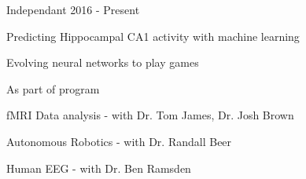 \begin{cventries}
\cvrpentry
    {Independant} %
    {} %
    {} %
    {2016 - Present} %
    {
      \begin{cvitems} %
        \item {Predicting Hippocampal CA1 activity with machine learning}
	\item {Evolving neural networks to play games}
      \end{cvitems}
    }

\cvrpentry
    {As part of program} %
    {} %
    {} %
    {} %
    {
      \begin{cvitems} %
        \item {fMRI Data analysis - with Dr. Tom James, Dr. Josh Brown}
	\item {Autonomous Robotics - with Dr. Randall Beer}
	\item{Human EEG - with Dr. Ben Ramsden }
      \end{cvitems}
    }




\end{cventries}
